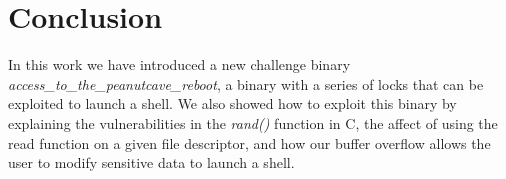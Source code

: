 \section{Conclusion}
In this work we have introduced a new challenge binary \emph{access\_to\_the\_peanutcave\_reboot}, a binary with a series of locks that can be exploited to launch a shell. We also showed how to exploit this binary by explaining the vulnerabilities in the \emph{rand()} function in C, the affect of using the read function on a given file descriptor, and how our buffer overflow allows the user to modify sensitive data to launch a shell. 
